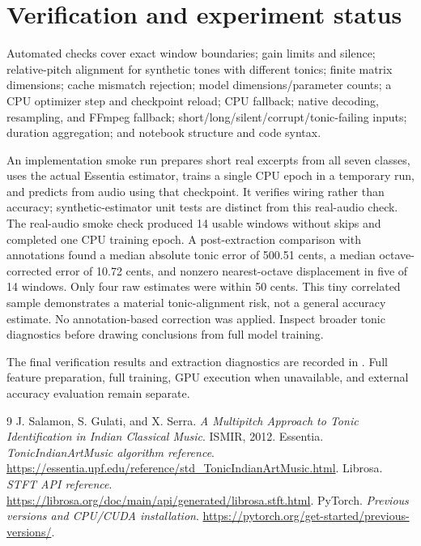 \documentclass[11pt,a4paper]{article}
\begin{document}
\section{Verification and experiment status}
Automated checks cover exact window boundaries; gain limits and silence;
relative-pitch alignment for synthetic tones with different tonics; finite matrix
dimensions; cache mismatch rejection; model dimensions/parameter counts; a CPU
optimizer step and checkpoint reload; CPU fallback; native decoding, resampling,
and FFmpeg fallback; short/long/silent/corrupt/tonic-failing inputs; duration
aggregation; and notebook structure and code syntax.

An implementation smoke run prepares short real excerpts from all seven classes,
uses the actual Essentia estimator, trains a single CPU epoch in a temporary run,
and predicts from audio using that checkpoint. It verifies wiring rather than
accuracy; synthetic-estimator unit tests are distinct from this real-audio check.
The real-audio smoke check produced 14 usable windows without skips and completed
one CPU training epoch. A post-extraction comparison with annotations found a
median absolute tonic error of 500.51 cents, a median octave-corrected error of
10.72 cents, and nonzero nearest-octave displacement in five of 14 windows.
Only four raw estimates were within 50 cents. This tiny correlated sample
demonstrates a material tonic-alignment risk, not a general accuracy estimate.
No annotation-based correction was applied. Inspect broader tonic diagnostics
before drawing conclusions from full model training.

The final verification results and extraction diagnostics are recorded in
. Full feature preparation, full training, GPU
execution when unavailable, and external accuracy evaluation remain separate.

\begin{thebibliography}{9}
 J. Salamon, S. Gulati, and X. Serra.
\emph{A Multipitch Approach to Tonic Identification in Indian Classical Music}.
ISMIR, 2012.
 Essentia. \emph{TonicIndianArtMusic algorithm reference}.
\url{https://essentia.upf.edu/reference/std_TonicIndianArtMusic.html}.
 Librosa. \emph{STFT API reference}.
\url{https://librosa.org/doc/main/api/generated/librosa.stft.html}.
 PyTorch. \emph{Previous versions and CPU/CUDA installation}.
\url{https://pytorch.org/get-started/previous-versions/}.
\end{thebibliography}
\end{document}
